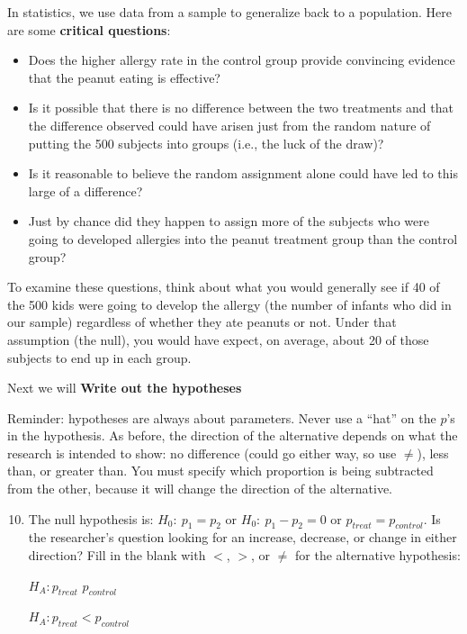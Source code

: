    In statistics, we use data from a sample to generalize back to a
   population.  Here are some {\bf critical questions}:
   \begin{itemize}
   \item Does the higher allergy rate in the control group provide
     convincing evidence that the peanut eating is effective?
   \item Is it possible that there is no difference between the two
     treatments and that the difference observed could have arisen
     just from the random nature of putting the 500 subjects into
     groups (i.e., the luck of the draw)?
   \item Is it reasonable to believe the random assignment alone could
     have led to this large of a difference?
   \item Just by chance did they happen to assign
     more of the subjects who were going to developed allergies into the peanut
     treatment group than the control group?
   \end{itemize}
 
   To examine these questions, think about what you would generally see if 
   40 of the 500 kids were going to develop the allergy (the number of
   infants  who did in our sample) regardless of whether they ate
   peanuts or not. Under that assumption (the null), you would have expect, on
   average, about 20 of those subjects to end up in each group. 

   \begin{center}
     Next we will {\bf Write out the hypotheses}
   \end{center}
  Reminder: hypotheses are always about parameters. Never use a ``hat''
   on the $p$'s in the hypothesis.  As before, the direction of the
   alternative depends on what the research is intended to show: no
   difference (could go either way, so use $\neq$), less than, or
   greater than.  You must specify which proportion is being
   subtracted from the other, because it will change the direction of
   the alternative.
 
 \begin{enumerate}
  \setcounter{enumi}{9}
   \item  The null hypothesis is: $H_0:\  p_1 = p_2$  or $H_0:\  p_1 -
     p_2 = 0$ or $p_{treat} =   p_{control}$. Is the researcher's question looking
     for an increase, decrease, or change in either direction?  Fill
     in the blank with $<$, $>$, or $\neq$ for the alternative
     hypothesis:  

\begin{students}
     $H_A:  p_{treat}$  \underline{\hspace{2cm}}   $p_{control}$
\end{students}
\begin{key}
   $H_A:  p_{treat} < p_{control}$
\end{key}     
\end{enumerate}

